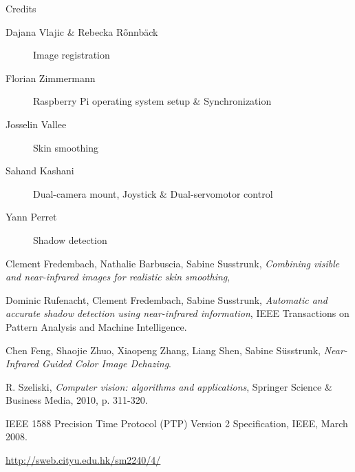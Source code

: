 \documentclass[10pt]{article}
\begin{document}
\begin{section}{Credits}
    \begin{description}
        \item [Dajana Vlajic \& Rebecka R{\H o}nnb{\"a}ck] Image registration
        \item [Florian Zimmermann] Raspberry Pi operating system setup \& Synchronization
        \item [Josselin Vallee] Skin smoothing
        \item [Sahand Kashani] Dual-camera mount, Joystick \& Dual-servomotor control
        \item [Yann Perret] Shadow detection
    \end{description}
\end{section}

\begin{thebibliography}{9}

    Clement Fredembach, Nathalie Barbuscia, Sabine Susstrunk,
    \emph{Combining visible and near-infrared images for realistic skin smoothing},

    Dominic Rufenacht, Clement Fredembach, Sabine Susstrunk,
    \emph{Automatic and accurate shadow detection using near-infrared information},
    IEEE Transactions on Pattern Analysis and Machine Intelligence.

    Chen Feng, Shaojie Zhuo, Xiaopeng Zhang, Liang Shen, Sabine Süsstrunk,
    \emph{Near-Infrared Guided Color Image Dehazing}.

    R. Szeliski,
    \emph{Computer vision: algorithms and applications},
    Springer Science \& Business Media, 2010, p. 311-320.

    {IEEE 1588 Precision Time Protocol (PTP) Version 2 Specification},
    IEEE,
    March 2008.

    \url{http://sweb.cityu.edu.hk/sm2240/4/}

\end{thebibliography}
\end{document}
